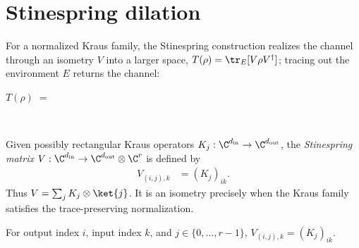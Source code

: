 \section{Stinespring dilation}
\label{sec:stinespring}

For a normalized Kraus family, the Stinespring construction realizes the
channel through an isometry $V$ into a larger space,
$T(\rho)=\tr_E[V\rho V^\dagger]$; tracing out the environment $E$ returns the
channel:
\begin{tenkzequation}
    \tenkzkernel
    $T(\rho) \;=\;$
    \begin{tenkz}[rows={ket,bra}, cols=1, west=open, east={cup=$\rho$}]
         \\
    \end{tenkz}
\end{tenkzequation}

\begin{definition}\label{def:stinespring_v}
    \leanok
    Given possibly rectangular Kraus operators
    $K_j:\C^{d_{\mathrm{in}}}\to\C^{d_{\mathrm{out}}}$, the
    \emph{Stinespring matrix}
    $V:\C^{d_{\mathrm{in}}}\to
       \C^{d_{\mathrm{out}}}\otimes\C^r$ is defined by
    \begin{align}
        V_{(i,j),k}
        &=(K_j)_{ik}.
        \label{eq:representations_stinespring_entries}
    \end{align}
    Thus $V=\sum_j K_j\otimes\ket{j}$. It is an isometry precisely when
    the Kraus family satisfies the trace-preserving normalization.
\end{definition}

\begin{lemma}\label{lem:stinespring_v_apply}
    \leanok
    For output index $i$, input index $k$, and $j\in\{0,\ldots,r-1\}$,
    $V_{(i,j),k}=(K_j)_{ik}$.
\end{lemma}

